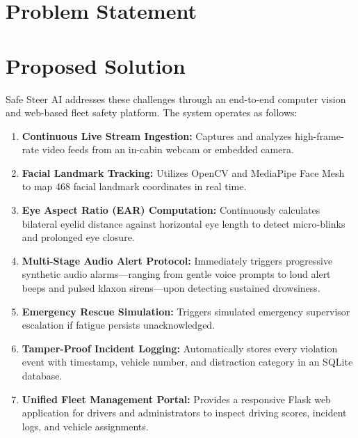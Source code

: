 \documentclass[a4paper,12pt]{report}
\begin{document}
\section{Problem Statement}
\begin{center}
\end{center}

\section{Proposed Solution}
\par
Safe Steer AI addresses these challenges through an end-to-end computer vision and web-based fleet safety platform. The system operates as follows:
\begin{enumerate}
    \item \textbf{Continuous Live Stream Ingestion:} Captures and analyzes high-frame-rate video feeds from an in-cabin webcam or embedded camera.
    \item \textbf{Facial Landmark Tracking:} Utilizes OpenCV and MediaPipe Face Mesh to map 468 facial landmark coordinates in real time.
    \item \textbf{Eye Aspect Ratio (EAR) Computation:} Continuously calculates bilateral eyelid distance against horizontal eye length to detect micro-blinks and prolonged eye closure.
    \item \textbf{Multi-Stage Audio Alert Protocol:} Immediately triggers progressive synthetic audio alarms---ranging from gentle voice prompts to loud alert beeps and pulsed klaxon sirens---upon detecting sustained drowsiness.
    \item \textbf{Emergency Rescue Simulation:} Triggers simulated emergency supervisor escalation if fatigue persists unacknowledged.
    \item \textbf{Tamper-Proof Incident Logging:} Automatically stores every violation event with timestamp, vehicle number, and distraction category in an SQLite database.
    \item \textbf{Unified Fleet Management Portal:} Provides a responsive Flask web application for drivers and administrators to inspect driving scores, incident logs, and vehicle assignments.
\end{enumerate}
\end{document}

